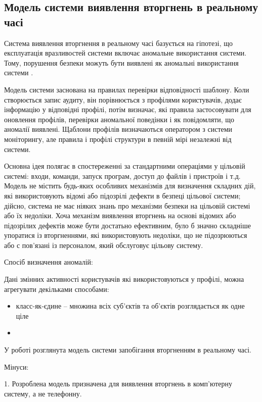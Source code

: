 \newpage
{}
\subsection{Модель системи виявлення вторгнень в реальному часі}
Система виявлення вторгнення в реальному часі базується на гіпотезі, що експлуатація вразливостей системи включає аномальне використання системи. Тому, порушення безпеки можуть бути виявлені як аномальні використання системи \cite{denning1987intrusion}.

Модель системи заснована на правилах перевірки відповідності шаблону. Коли створюється запис аудиту, він порівнюється з профілями користувачів, додає інформацію у відповідні профілі, потім визначає, які правила застосовувати для оновлення профілів, перевірки аномальної поведінки і як повідомляти, що аномалії виявлені. Щаблони профілів визначаються оператором з системи моніторингу, але правила і профілі структури в певній мірі незалежні від системи. %

Основна ідея полягає в спостереженні за стандартними операціями у цільовій системі: входи, команди, запуск програм, доступ до файлів і пристроїв і т.д. Модель не містить будь-яких особливих механізмів для визначення складних дій, які використовують відомі або підозрілі дефекти в безпеці цільової системи; дійсно, система не має ніяких знань про механізми безпеки на цільовій системі або їх недоліки. Хоча механізм виявлення вторгнень на основі відомих або підозрілих дефектів може бути достатьно ефективним, було б значно складніше упоратися із вторгненнями, які використовують недоліки, що не підозрюються або с пов'язані із персоналом, який обслуговує цільову систему.

Спосіб визначення аномалій:

    Дані змінних активності користувачів які використовуються у профілі, можна агрегувати декільками способами: %

\begin{itemize}
  \item класс-як-єдине -- множина всіх суб'єктів та об'єктів розглядається як одне ціле
  \item \TBD
\end{itemize}

    У роботі  розглянута модель системи запобігання вторгненням в реальному часі.

	Мінуси:

	1. Розроблена модель призначена для виявлення вторгнень в комп'ютерну систему, а не телефонну.

